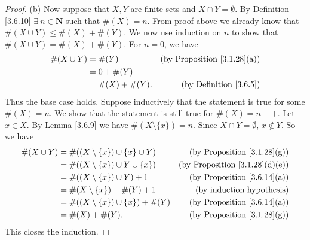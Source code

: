 \begin{proof}{(b)}
    Now suppose that \(X, Y\) are finite sets and \(X \cap Y = \emptyset\).
    By Definition \ref{3.6.10} \(\exists\ n \in \mathbf{N}\) such that \(\#(X) = n\).
    From proof above we already know that \(\#(X \cup Y) \leq \#(X) + \#(Y)\).
    We now use induction on \(n\) to show that \(\#(X \cup Y) = \#(X) + \#(Y)\).
    For \(n = 0\), we have
    \begin{align*}
        \#(X \cup Y) & = \#(Y)          & \text{(by Proposition \ref{3.1.28}(a))} \\
                     & = 0 + \#(Y)                                                \\
                     & = \#(X) + \#(Y). & \text{(by Definition \ref{3.6.5})}
    \end{align*}
    Thus the base case holds.
    Suppose inductively that the statement is true for some \(\#(X) = n\).
    We show that the statement is still true for \(\#(X) = n++\).
    Let \(x \in X\).
    By Lemma \ref{3.6.9} we have \(\#(X \setminus \{x\}) = n\).
    Since \(X \cap Y = \emptyset\), \(x \notin Y\).
    So we have
    \begin{align*}
        \#(X \cup Y) & = \#((X \setminus \{x\}) \cup \{x\} \cup Y)  & \text{(by Proposition \ref{3.1.28}(g))}    \\
                     & = \#((X \setminus \{x\}) \cup Y \cup \{x\})  & \text{(by Proposition \ref{3.1.28}(d)(e))} \\
                     & = \#((X \setminus \{x\}) \cup Y) + 1         & \text{(by Proposition \ref{3.6.14}(a))}    \\
                     & = \#(X \setminus \{x\}) + \#(Y) + 1          & \text{(by induction hypothesis)}           \\
                     & = \#((X \setminus \{x\}) \cup \{x\}) + \#(Y) & \text{(by Proposition \ref{3.6.14}(a))}    \\
                     & = \#(X) + \#(Y).                             & \text{(by Proposition \ref{3.1.28}(g))}
    \end{align*}
    This closes the induction.
\end{proof}

